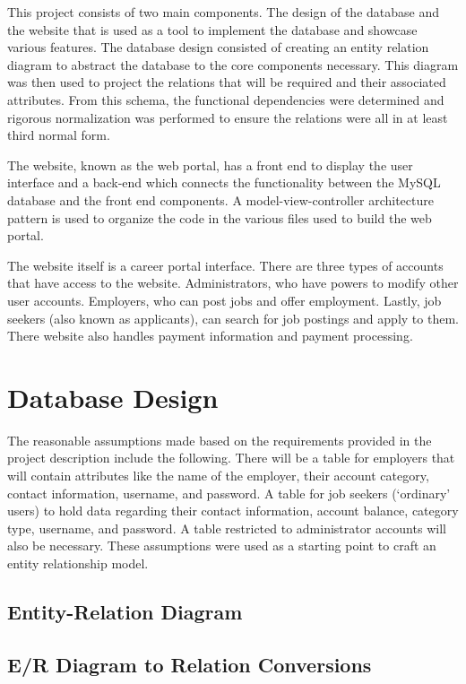 \documentclass[11pt]{article}
\begin{document}
This project consists of two main components. The design of the database and the website that is used as a tool to implement the database and showcase various features. The database design consisted of creating an entity relation diagram to abstract the database to the core components necessary. This diagram was then used to project the relations that will be required and their associated attributes. From this schema, the functional dependencies were determined and rigorous normalization was performed to ensure the relations were all in at least third normal form. \par
The website, known as the web portal, has a front end to display the user interface and a back-end which connects the functionality between the MySQL database and the front end components. A model-view-controller architecture pattern is used to organize the code in the various files used to build the web portal. \par
The website itself is a career portal interface. There are three types of accounts that have access to the website. Administrators, who have powers to modify other user accounts. Employers, who can post jobs and offer employment. Lastly, job seekers (also known as applicants), can search for job postings and apply to them. There website also handles payment information and payment processing.
\section{Database Design}

The reasonable assumptions made based on the requirements provided in the project description include the following. There will be a table for employers that will contain attributes like the name of the employer, their account category, contact information, username, and password. A table for job seekers (`ordinary' users) to hold data regarding their contact information, account balance, category type, username, and password. A table restricted to administrator accounts will also be necessary. These assumptions were used as a starting point to craft an entity relationship model.

\subsection{Entity-Relation Diagram}

\subsection{E/R Diagram to Relation Conversions}
\end{document}
